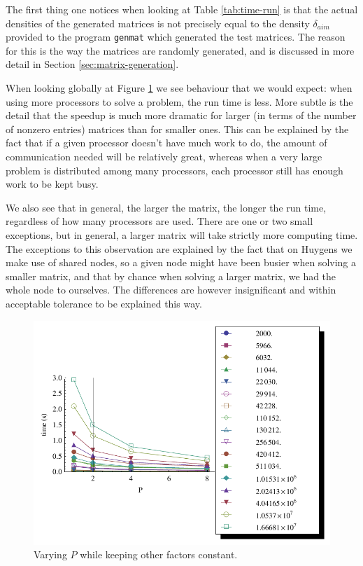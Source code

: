\documentclass[a4paper]{article}
\begin{document}
The first thing one notices when looking at Table \ref{tab:time-run} is that the actual densities of
the generated matrices is not precisely equal to the density $\delta_{aim}$ provided to the program
\texttt{genmat} which generated the test matrices. The reason for this is the way the matrices are
randomly generated, and is discussed in more detail in Section \ref{sec:matrix-generation}.

When looking globally at Figure \ref{fig:time-run} we see behaviour that we would expect: when
using more processors to solve a problem, the run time is less. More subtle is the detail that the
speedup is much more dramatic for larger (in terms of the number of nonzero entries) matrices than for smaller
ones. This can be explained by the fact that if a given processor doesn't have much work to do, the
amount of communication needed will be relatively great, whereas when a very large problem is distributed among
many processors, each processor still has enough work to be kept busy.

We also see that in general, the larger the matrix, the longer the run time, regardless of how many processors
are used. There are one or two small exceptions, but in general, a larger matrix will take strictly more computing
time. The exceptions to this observation are explained by the fact that on Huygens we make use of
shared nodes, so a given node might have been busier when solving a smaller matrix, and that by chance when
solving a larger matrix, we had the whole node to ourselves. The differences are however insignificant and
within acceptable tolerance to be explained this way.

\begin{figure}[h]
    \begin{center}
        \includegraphics[width=\legendplotsize]{img/time-run.pdf}
    \end{center}
    \caption{Varying $P$ while keeping other factors constant.}
    \label{fig:time-run}
\end{figure}
\end{document}
